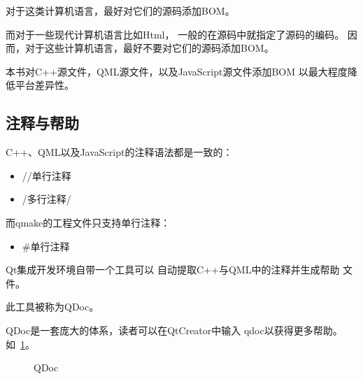 对于这类计算机语言，最好对它们的源码添加BOM。

而对于一些现代计算机语言比如Html，
一般的在源码中就指定了源码的编码。
因而，对于这些计算机语言，最好不要对它们的源码添加BOM。

本书对C{\sourcefonttwo{}+}{\sourcefonttwo{}+}源文件，QML源文件，以及JavaScript源文件添加BOM
以最大程度降低平台差异性。

\FloatBarrier
\subsection{
注释与帮助
}\label{c000011s000000s02}


C{\sourcefonttwo{}+}{\sourcefonttwo{}+}、QML以及JavaScript的注释语法都是一致的：

\begin{itemize}
\item //单行注释
\item /\raisebox{-0.35ex}{\sourcefonttwo{}*}多行注释\raisebox{-0.35ex}{\sourcefonttwo{}*}/
\end{itemize}

而qmake的工程文件只支持单行注释：
\begin{itemize}
\item {\sourcefonttwo\#}单行注释
\end{itemize}



Qt集成开发环境自带一个工具可以
自动提取C{\sourcefonttwo{}+}{\sourcefonttwo{}+}与QML中的注释并生成帮助
文件。

此工具被称为QDoc。

QDoc是一套庞大的体系，读者可以在QtCreator中输入
qdoc以获得更多帮助。
如\figurename\ \ref{p000043}。

\begin{figure}[htb] %
\marginnote{\setlength\fboxsep{2pt}\fbox{\footnotesize{\kaishu\figurename\,}\footnotesize{\ref{p000043}}}}\centering %
\setlength\fboxsep{0pt} %
\caption{QDoc} %
\label{p000043} %
\end{figure}





